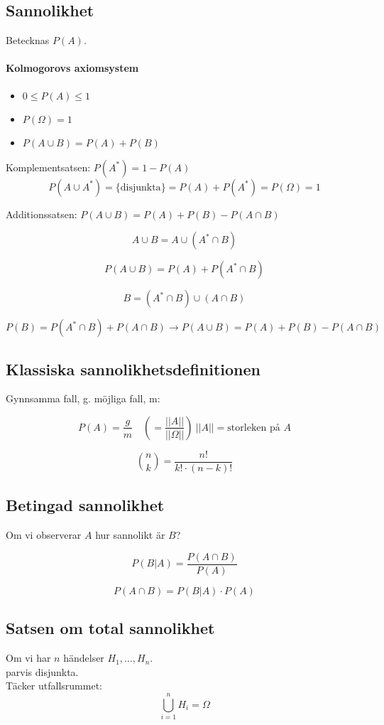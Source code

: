 \documentclass[12pt]{article} %
\begin{document}
\subsection{Sannolikhet}
Betecknas $P(A)$.

\paragraph{Kolmogorovs axiomsystem}
\begin{itemize}
    \item $0 \leq P(A) \leq 1$
    \item $P(\Omega) = 1$
    \item $P(A \cup B) = P(A) + P(B)$
\end{itemize}

Komplementsatsen: $P(A^*) = 1 - P(A)$
\[
    P(A \cup A^*) = \{\text{disjunkta}\} = P(A) + P(A^*) = P(\Omega) = 1
\]

Additionssatsen:
$P(A \cup B) = P(A) + P(B) - P(A \cap B)$

\[
    A \cup B = A \cup (A^* \cap B)
\]

\[
    P(A \cup B) = P(A) + P(A^* \cap B)
\]

\[
    B = (A^* \cap B) \cup (A \cap B)
\]

\[
    P(B) = P(A^* \cap B) + P(A \cap B) \to P(A \cup B) = P(A) + P(B) - P(A \cap B)
\]

\subsection{Klassiska sannolikhetsdefinitionen}
Gynnsamma fall, g. möjliga fall, m:

\[
    P(A) = \frac{g}{m} \quad (= \frac{||A||}{||\Omega||}) \ ||A|| = \text{storleken på } A
\]

\[
    \binom{n}{k} = \frac{n!}{k! \cdot (n-k)!}
\]

\subsection{Betingad sannolikhet}
Om vi observerar $A$ hur sannolikt är $B$?

\[
    P(B | A) = \frac{P(A \cap B)}{P(A)}
\]

\[
    P(A \cap B) = P(B | A) \cdot P(A)
\]

\subsection{Satsen om total sannolikhet}
Om vi har $n$ händelser $H_1, \ldots, H_n$. \\
parvis disjunkta. \\
Täcker utfallsrummet: 
\[
    \bigcup_{i = 1}^{n} H_i = \Omega
\]
\end{document}
